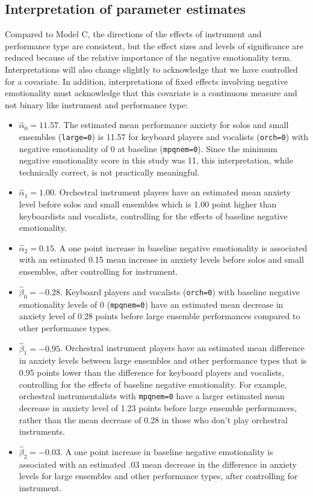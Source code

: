 \documentclass[
]{krantz}
\providecommand{\tightlist}{%
  \setlength{\itemsep}{0pt}\setlength{\parskip}{0pt}}
\begin{document}
\hypertarget{interp:modeld}{%
\subsection{Interpretation of parameter estimates}\label{interp:modeld}}

Compared to Model C, the directions of the effects of instrument and performance type are consistent, but the effect sizes and levels of significance are reduced because of the relative importance of the negative emotionality term. Interpretations will also change slightly to acknowledge that we have controlled for a covariate. In addition, interpretations of fixed effects involving negative emotionality must acknowledge that this covariate is a continuous measure and not binary like instrument and performance type:

\begin{itemize}
\tightlist
\item
  \(\hat{\alpha}_{0} = 11.57\). The estimated mean performance anxiety for solos and small ensembles (\texttt{large=0}) is 11.57 for keyboard players and vocalists (\texttt{orch=0}) with negative emotionality of 0 at baseline (\texttt{mpqnem=0}). Since the minimum negative emotionality score in this study was 11, this interpretation, while technically correct, is not practically meaningful.
\item
  \(\hat{\alpha}_{1} = 1.00\). Orchestral instrument players have an estimated mean anxiety level before solos and small ensembles which is 1.00 point higher than keyboardists and vocalists, controlling for the effects of baseline negative emotionality.
\item
  \(\hat{\alpha}_{2} = 0.15\). A one point increase in baseline negative emotionality is associated with an estimated 0.15 mean increase in anxiety levels before solos and small ensembles, after controlling for instrument.
\item
  \(\hat{\beta}_{0} = -0.28\). Keyboard players and vocalists (\texttt{orch=0}) with baseline negative emotionality levels of 0 (\texttt{mpqnem=0}) have an estimated mean decrease in anxiety level of 0.28 points before large ensemble performances compared to other performance types.
\item
  \(\hat{\beta}_{1} = -0.95\). Orchestral instrument players have an estimated mean difference in anxiety levels between large ensembles and other performance types that is 0.95 points lower than the difference for keyboard players and vocalists, controlling for the effects of baseline negative emotionality. For example, orchestral instrumentalists with \texttt{mpqnem=0} have a larger estimated mean decrease in anxiety level of 1.23 points before large ensemble performances, rather than the mean decrease of 0.28 in those who don't play orchestral instruments.
\item
  \(\hat{\beta}_{2} = -0.03\). A one point increase in baseline negative emotionality is associated with an estimated .03 mean decrease in the difference in anxiety levels for large ensembles and other performance types, after controlling for instrument.
\end{itemize}
\end{document}
